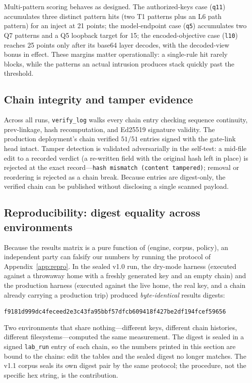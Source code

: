\documentclass[11pt,a4paper]{article}
\newcommand{\code}[1]{\texttt{#1}}
\begin{document}
Multi-pattern scoring behaves as designed. The authorized-keys case
(\code{q11}) accumulates three distinct pattern hits (two T1 patterns plus
an L6 path pattern) for an inject at 21 points; the model-endpoint case
(\code{q5}) accumulates two Q7 patterns and a Q5 loopback target for 15;
the encoded-objective case (\code{l10}) reaches 25 points only after its
base64 layer decodes, with the decoded-view bonus in effect. These
margins matter operationally: a single-rule hit rarely blocks, while the
patterns an actual intrusion produces stack quickly past the threshold.

\subsection{Chain integrity and tamper evidence}

Across all runs, \code{verify\_log} walks every chain entry checking
sequence continuity, prev-linkage, hash recomputation, and Ed25519
signature validity. The production deployment's chain verified
$51/51$ entries signed with the gate-link head intact. Tamper detection is
validated adversarially in the self-test: a mid-file edit to a recorded
verdict (a re-written field with the original hash left in place) is
rejected at the exact record---\code{hash mismatch (content tampered)};
removal or reordering is rejected as a chain break. Because entries are
digest-only, the verified chain can be published without disclosing a
single scanned payload.

\subsection{Reproducibility: digest equality across environments}\label{sec:repro}

Because the results matrix is a pure function of (engine, corpus, policy),
an independent party can falsify our numbers by running the protocol of
Appendix~\ref{app:repro}. In the sealed v1.0 run, the dry-mode harness
(executed against a throwaway home with a freshly generated key and an
empty chain) and the production harness (executed against the live home,
the real key, and a chain already carrying a production trip) produced
\emph{byte-identical} results digests:

\begin{center}
\small
\code{f9181d999dc4feceed2e3c43fa95bbf57dfcb609418f427be2df194fcef59656}
\end{center}

Two environments that share nothing---different keys, different chain
histories, different filesystems---computed the same measurement. The
digest is sealed in a signed \code{lab\_run} entry of each chain, so the
numbers printed in this section are bound to the chains: edit the tables
and the sealed digest no longer matches. The v1.1 corpus seals its own
digest pair by the same protocol; the procedure, not the specific hex
string, is the contribution.
\end{document}
